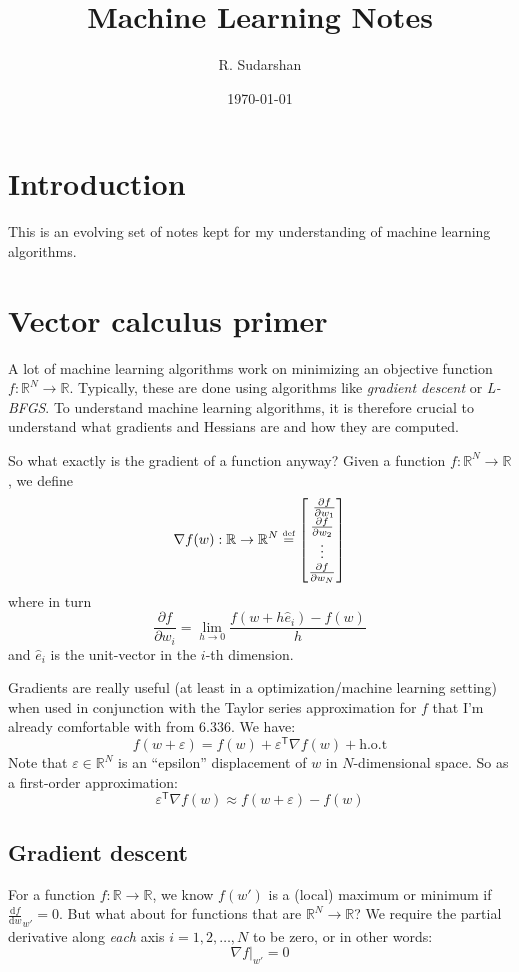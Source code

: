 \documentclass[12pt]{article}
\title{Machine Learning Notes}
\author{R. Sudarshan}
\date{\today}
\newcommand{\defeq}{\ensuremath\stackrel{\text{\tiny def}}{=}}
\begin{document}
\maketitle
\tableofcontents

\section{Introduction}
This is an evolving set of notes kept for my understanding of machine
learning algorithms.

\section{Vector calculus primer}
A lot of machine learning algorithms work on minimizing an objective
function $f: \mathbb{R}^{N}\rightarrow\mathbb{R}$. Typically, these
are done using algorithms like \textit{gradient descent} or
\textit{L-BFGS}. To understand machine learning algorithms, it is
therefore crucial to understand what gradients and Hessians are and
how they are computed.


So what exactly is the gradient of a function anyway? Given a function $f:\mathbb{R}^N\rightarrow\mathbb{R}$, we define
\[
\nabla{f}(w):\mathbb{R}\to\mathbb{R}^N \defeq \begin{bmatrix}\
  \frac{\partial{f}}{\partial{w_1}} \\
  \frac{\partial{f}}{\partial{w_2}} \\
  \vdots \\
  \frac{\partial{f}}{\partial{w_{N}}} \\
  \end{bmatrix}
\]
where in turn
\[
\frac{\partial{f}}{\partial{w_i}} = \lim_{h\to0}\frac{f(w+h\hat{e}_i) - f(w)}{h}
\]
and $\hat{e}_i$ is the unit-vector in the $i$-th dimension.

Gradients are really useful (at least in a optimization/machine
learning setting) when used in conjunction with the Taylor series
approximation for $f$ that I'm already comfortable with from 6.336. We have:
\[
f(w + \varepsilon) = f(w) + \varepsilon^{\mathsf{T}} \nabla{f}(w) + \text{h.o.t}
\]
Note that $\varepsilon \in \mathbb{R}^N$ is an ``epsilon''
displacement of $w$ in $N$-dimensional space. So as a first-order
approximation:
\[
\varepsilon^{\mathsf{T}}\nabla{f}(w) \approx f(w+\varepsilon) - f(w)
\]

\subsection{Gradient descent}
For a function $f:\mathbb{R}\to\mathbb{R}$, we know $f(w')$ is a
(local) maximum or minimum if
$\frac{\text{d}f}{\text{d}w}_{w'}=0$. But what about for functions
that are $\mathbb{R}^N\to\mathbb{R}$? We require the partial
derivative along \textit{each} axis $i = 1,2,\ldots,N$ to be zero, or in other words:
\[
\left.\nabla{f}\right|_{w'} = 0
\]
\end{document}
